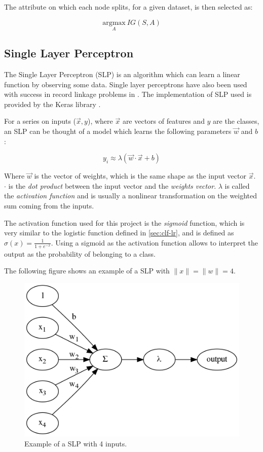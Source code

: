 \documentclass[epsfig,a4paper,11pt,titlepage,twoside,openany]{book}
\begin{document}
The attribute on which each node splits, for a given dataset, is then selected as:

\begin{equation*}
    \underset{A}{\mathrm{argmax}}\ IG(S, A)
\end{equation*}



\subsection{Single Layer Perceptron}
\label{sec:clf-slp}

The Single Layer Perceptron (SLP) \cite{Goodfellow-et-al-2016} is an algorithm which can learn a linear function by observing some data. Single layer perceptrons have also been used with success in record linkage problems in \cite{Wilson2011_slp_in_rl}. The implementation of SLP used is provided by the Keras library \cite{chollet2015keras}.

For a series on inputs ($\vec{x}, y$), where $\vec{x}$ are vectors of features and $y$ are the classes, an SLP can be thought of a model which learns the following parameters $\vec{w}$ and $b$:

\begin{equation*}
    y_i \approx \lambda(\vec{w} \cdot \vec{x} + b)
\end{equation*}

Where $\vec{w}$ is the vector of weights, which is the same shape as the input vector $\vec{x}$. $\cdot$ is the \textit{dot product} between the input vector and the \textit{weights vector}. $\lambda$ is called the \textit{activation function} and is usually a nonlinear transformation on the weighted sum coming from the inputs. 

The activation function used for this project is the \textit{sigmoid} function, which is very similar to the logistic function defined in \autoref{sec:clf-lr}, and is defined as $\sigma(x) = \frac{1}{1 + e ^ {-x}}$. Using a sigmoid as the activation function allows to interpret the output as the probability of belonging to a class.

The following figure shows an example of a SLP with $\|x\| = \|w\| = 4$.

\begin{figure}[H]
  \centering \includegraphics[width=.5\textwidth]{slp_example} 
  \caption{Example of a SLP with 4 inputs.}
  \label{fig:slp-example}
\end{figure}
\end{document}
